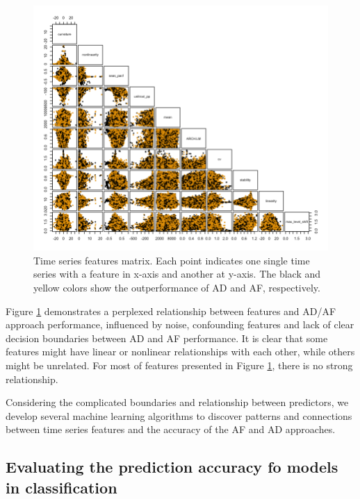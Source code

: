 \documentclass[preprint, 3p,
authoryear]{elsarticle} %
\begin{document}
\begin{figure}[H]

{\centering \includegraphics[width=1\linewidth]{img/300dpi/pair_plot} 

}

\caption{Time series features matrix. Each point indicates one single time series with a feature in x-axis and another at y-axis. The black and yellow colors show the outperformance of AD and AF, respectively.}\label{fig:featuresmatrix}
\end{figure}

Figure \ref{fig:featuresmatrix} demonstrates a perplexed relationship
between features and AD/AF approach performance, influenced by noise,
confounding features and lack of clear decision boundaries between AD
and AF performance. It is clear that some features might have linear or
nonlinear relationships with each other, while others might be
unrelated. For most of features presented in Figure
\ref{fig:featuresmatrix}, there is no strong relationship.

Considering the complicated boundaries and relationship between
predictors, we develop several machine learning algorithms to discover
patterns and connections between time series features and the accuracy
of the AF and AD approaches.

\hypertarget{evaluating-the-prediction-accuracy-fo-models-in-classification}{%
\subsection{Evaluating the prediction accuracy fo models in
classification}\label{evaluating-the-prediction-accuracy-fo-models-in-classification}}
\end{document}

